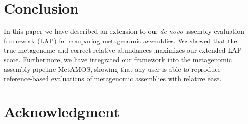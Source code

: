 \documentclass[conference]{IEEEtran}
\begin{document}
%





\section{Conclusion}
In this paper we have described an extension to our \emph{de novo} assembly evaluation framework (LAP) for comparing metagenomic assemblies.
We showed that the true metagenome and correct relative abundances maximizes our extended LAP score.
Furthermore, we have integrated our framework into the metagenomic assembly pipeline MetAMOS, showing that any user is able to reproduce reference-based evaluations of metagenomic assemblies with relative ease.




\section*{Acknowledgment}
\end{document}
